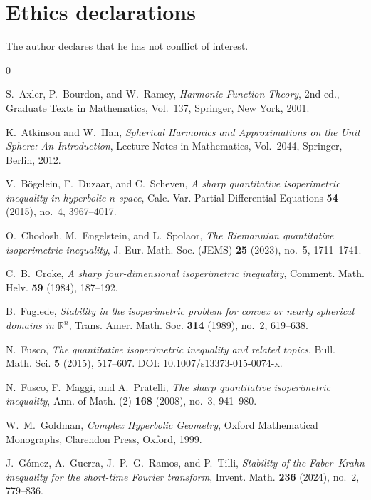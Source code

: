\documentclass[11pt]{amsart}
\numberwithin{equation}{section}
\begin{document}
\section*{Ethics declarations}
The author declares that he has not conflict of interest.






\begin{thebibliography}{0}

S.~Axler, P.~Bourdon, and W.~Ramey,
\emph{Harmonic Function Theory}, 2nd ed.,
Graduate Texts in Mathematics, Vol.~137,
Springer, New York, 2001.

K.~Atkinson and W.~Han,
\emph{Spherical Harmonics and Approximations on the Unit Sphere: An Introduction},
Lecture Notes in Mathematics, Vol.~2044,
Springer, Berlin, 2012.

V.~B\"ogelein, F.~Duzaar, and C.~Scheven,
\emph{A sharp quantitative isoperimetric inequality in hyperbolic $n$-space},
Calc. Var. Partial Differential Equations \textbf{54} (2015), no.~4, 3967--4017.

O.~Chodosh, M.~Engelstein, and L.~Spolaor,
\emph{The Riemannian quantitative isoperimetric inequality},
J. Eur. Math. Soc. (JEMS) \textbf{25} (2023), no.~5, 1711--1741.

C.~B.~Croke,
\emph{A sharp four-dimensional isoperimetric inequality},
Comment. Math. Helv. \textbf{59} (1984), 187--192.

B.~Fuglede,
\emph{Stability in the isoperimetric problem for convex or nearly spherical domains in $\mathbb{R}^n$},
Trans. Amer. Math. Soc. \textbf{314} (1989), no.~2, 619--638.

N.~Fusco,
\emph{The quantitative isoperimetric inequality and related topics},
Bull. Math. Sci. \textbf{5} (2015), 517--607.
DOI: \href{https://doi.org/10.1007/s13373-015-0074-x}{10.1007/s13373-015-0074-x}.

N.~Fusco, F.~Maggi, and A.~Pratelli,
\emph{The sharp quantitative isoperimetric inequality},
Ann. of Math. (2) \textbf{168} (2008), no.~3, 941--980.

W.~M.~Goldman,
\emph{Complex Hyperbolic Geometry},
Oxford Mathematical Monographs,
Clarendon Press, Oxford, 1999.

J.~G{\'o}mez, A.~Guerra, J.~P.~G.~Ramos, and P.~Tilli,
\emph{Stability of the Faber--Krahn inequality for the short-time Fourier transform},
Invent. Math. \textbf{236} (2024), no.~2, 779--836.


\end{thebibliography}
\end{document}
